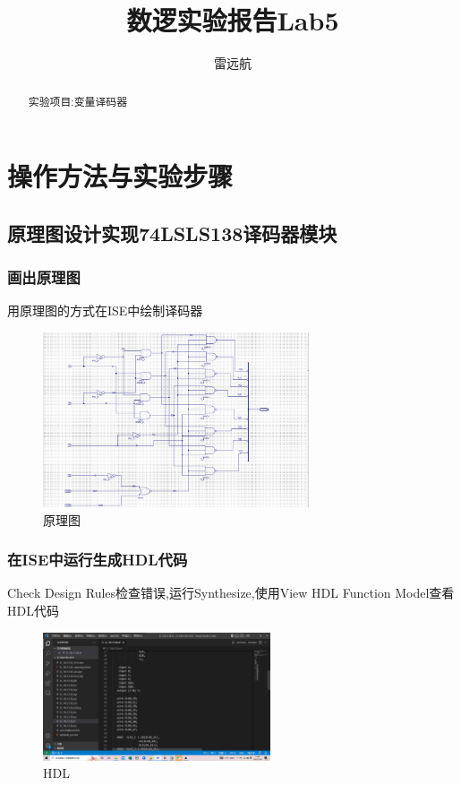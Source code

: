 \documentclass{article}
\title{数逻实验报告Lab5}
\author{雷远航}
\begin{document}
\maketitle

\begin{abstract}
实验项目:变量译码器
\end{abstract}

\section{操作方法与实验步骤}

\subsection{原理图设计实现74LSLS138译码器模块}

\subsubsection{画出原理图}
用原理图的方式在ISE中绘制译码器
    \begin{figure}[H]
	\centering
	\includegraphics[width=0.7\textwidth]{9.png}
	\caption{\label{Lab5}原理图}
	\end{figure}

\subsubsection{在ISE中运行生成HDL代码}
Check Design Rules检查错误,运行Synthesize,使用View HDL Function Model查看HDL代码
    \begin{figure}[H]
	\centering
	\includegraphics[width=0.6\textwidth]{2.png}
	\caption{\label{Lab5}HDL}
	\end{figure}
\end{document}
